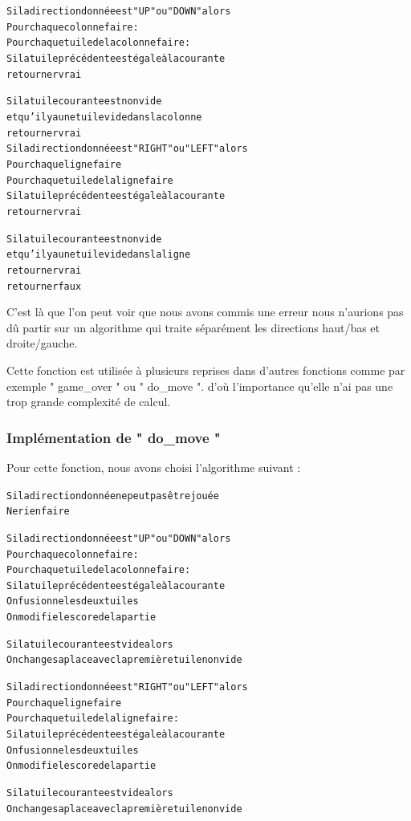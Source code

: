 \documentclass[12pt]{article}
\begin{document}
\begin{alltt}
{\color{gray}
Si la direction donnée est " UP " ou " DOWN " alors
    Pour chaque colonne faire :
        Pour chaque tuile de la colonne faire :
            Si la tuile précédente est égale à la courante
                retourner vrai
 		
            Si la tuile courante est non vide 
                   et qu'il y a une tuile vide dans la colonne
                retourner vrai	    	
Si la direction donnée est " RIGHT " ou " LEFT " alors
    Pour chaque ligne faire 
        Pour chaque tuile de la ligne faire
            Si la tuile précédente est égale à la courante
                retourner vrai
 		
            Si la tuile courante est non vide
                   et qu'il y a une tuile vide dans la ligne
                retourner vrai	    	
retourner faux
}
\end{alltt}

C'est là que l'on peut voir que nous avons commis une erreur nous n'aurions
pas d\^u partir sur un algorithme qui traite séparément les directions haut/bas et droite/gauche.

Cette fonction est utilisée à plusieurs reprises dans d'autres fonctions
comme par exemple " game\_over " ou " do\_move ". d'o\`u
l'importance qu'elle n'ai pas une trop grande complexité de calcul.

\subsubsection{Implémentation de " do\_move "}
Pour cette fonction, nous avons choisi l'algorithme suivant :
\begin{alltt}
{\color{gray}
Si la direction donnée ne peut pas être jouée
    Ne rien faire
     
Si la direction donnée est " UP " ou " DOWN " alors
    Pour chaque colonne faire :
        Pour chaque tuile de la colonne faire :
            Si la tuile précédente est égale à la courante
                On fusionne les deux tuiles
                On modifie le score de la partie
            
            Si la tuile courante est vide alors
            	On change sa place avec la première tuile non vide
            	
Si la direction donnée est " RIGHT " ou " LEFT " alors
    Pour chaque ligne faire 
        Pour chaque tuile de la ligne faire :
            Si la tuile précédente est égale à la courante
                On fusionne les deux tuiles
                On modifie le score de la partie
            
            Si la tuile courante est vide alors
            	On change sa place avec la première tuile non vide
}
\end{alltt}
\end{document}
